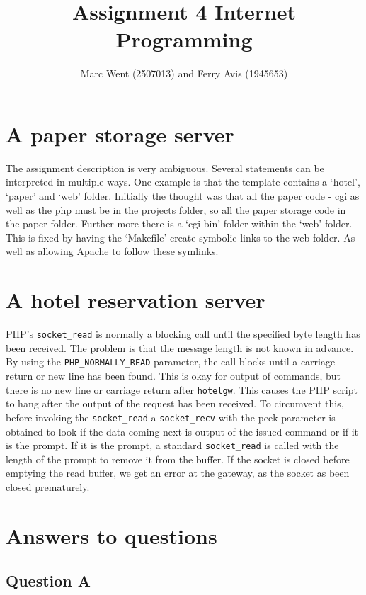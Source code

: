 \documentclass[11pt]{article}
\title{Assignment 4 Internet Programming}
\author{Marc Went (2507013) and Ferry Avis (1945653)}
\begin{document}
\maketitle
\section{A paper storage server}

The assignment description is very ambiguous. Several statements can be interpreted in multiple ways. One example is that the template contains a `hotel', `paper' and `web' folder. Initially the thought was that all the paper code - cgi as well as the php must be in the projects folder, so all the paper storage code in the paper folder. Further more there is a `cgi-bin' folder within the `web' folder.
This is fixed by having the `Makefile' create symbolic links to the web folder. As well as allowing Apache to follow these symlinks. 

\section{A hotel reservation server}

PHP's \texttt{socket\_read} is normally a blocking call until the specified byte length has been received. The problem is that the message length is not known in advance. By using the \texttt{PHP\_NORMALLY\_READ} parameter, the call blocks until a carriage return or new line has been found. This is okay for output of commands, but there is no new line or carriage return after \texttt{hotelgw}. This causes the PHP script to hang after the output of the request has been received. To circumvent this, before invoking the \texttt{socket\_read} a \texttt{socket\_recv} with the peek parameter is obtained to look if the data coming next is output of the issued command or if it is the prompt. If it is the prompt, a standard \texttt{socket\_read} is called with the length of the prompt to remove it from the buffer. If the socket is closed before emptying the read buffer, we get an error at the gateway, as the socket as been closed prematurely.

\section{Answers to questions}

\subsection{Question A}
\end{document}
